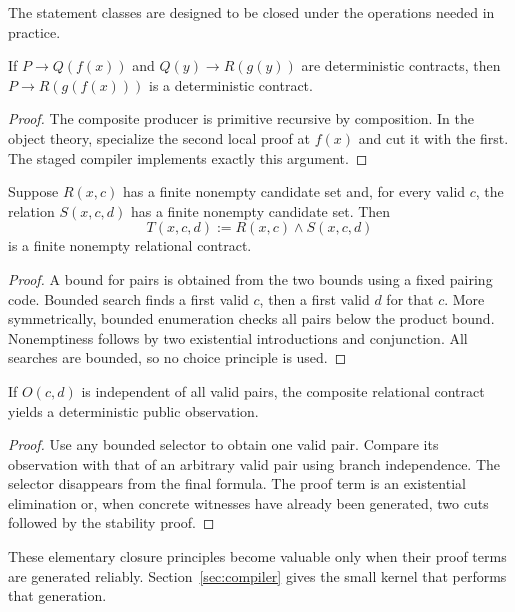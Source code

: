 The statement classes are designed to be closed under the operations needed in practice.

\begin{proposition}
If \(P\to Q(f(x))\) and \(Q(y)\to R(g(y))\) are deterministic contracts, then
\(P\to R(g(f(x)))\) is a deterministic contract.
\end{proposition}
\begin{proof}
The composite producer is primitive recursive by composition.  In the object theory, specialize the second
local proof at \(f(x)\) and cut it with the first.  The staged compiler implements exactly this argument.
\end{proof}

\begin{proposition}
Suppose \(R(x,c)\) has a finite nonempty candidate set and, for every valid \(c\), the relation
\(S(x,c,d)\) has a finite nonempty candidate set.  Then
\[
 T(x,c,d):=R(x,c)\wedge S(x,c,d)
\]
is a finite nonempty relational contract.
\end{proposition}
\begin{proof}
A bound for pairs is obtained from the two bounds using a fixed pairing code.  Bounded search finds a first
valid \(c\), then a first valid \(d\) for that \(c\).  More symmetrically, bounded enumeration checks all
pairs below the product bound.  Nonemptiness follows by two existential introductions and conjunction.
All searches are bounded, so no choice principle is used.
\end{proof}

\begin{proposition}
If \(O(c,d)\) is independent of all valid pairs, the composite relational contract yields a deterministic
public observation.
\end{proposition}
\begin{proof}
Use any bounded selector to obtain one valid pair.  Compare its observation with that of an arbitrary valid
pair using branch independence.  The selector disappears from the final formula.  The proof term is an
existential elimination or, when concrete witnesses have already been generated, two cuts followed by the
stability proof.
\end{proof}

These elementary closure principles become valuable only when their proof terms are generated reliably.
Section~\ref{sec:compiler} gives the small kernel that performs that generation.
